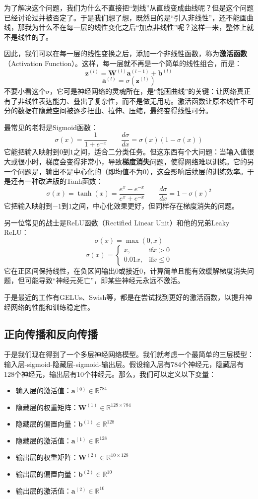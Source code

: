 为了解决这个问题，我们为什么不直接把“划线”从直线变成曲线呢？但是这个问题已经讨论过并被否定了。于是我们想了想，既然目的是“引入非线性”，还不能画曲线，那我为什么不在每一层的线性变化之后“加点非线性”呢？这样一来，整体上就不是线性的了。

因此，我们可以在每一层的线性变换之后，添加一个非线性函数，称为\textbf{激活函数}（Activation Function）。这样，每一层就不再是一个简单的线性组合，而是：
\[ \mathbf{z}^{(l)} = \mathbf{W}^{(l)} \mathbf{a}^{(l-1)} + \mathbf{b}^{(l)} \]
\[ \mathbf{a}^{(l)} = \sigma(\mathbf{z}^{(l)}) \]
不要小看这个$\sigma$，它可是神经网络的灵魂所在，是“能画曲线”的关键：让网络真正有了非线性表达能力、叠出了复杂性，而不是做无用功。激活函数让原本线性不可分的数据在隐藏空间被逐步扭曲、拉伸、压缩，最终变得线性可分。

最常见的老将是Sigmoid函数：
\[ \sigma(x) = \frac{1}{1 + e^{-x}} \qquad \frac{d\sigma}{dx} = \sigma(x)(1 - \sigma(x)) \]
它能把输入映射到$0$到$1$之间，适合二分类任务。但这东西有个大问题：当输入值很大或很小时，梯度会变得非常小，导致\textbf{梯度消失}问题，使得网络难以训练。它的另一个问题是，输出不是中心化的（即均值不为0），这会影响后续层的训练效率。于是还有一种改进版的Tanh函数：
\[ \sigma(x) = \tanh(x) = \frac{e^{x} - e^{-x}}{e^{x} + e^{-x}} \qquad \frac{d\sigma}{dx} = 1 - \sigma(x)^2\]
它把输入映射到$-1$到$1$之间，中心化效果更好，但同样存在梯度消失的问题。

另一位常见的战士是ReLU函数（Rectified Linear Unit）和他的兄弟Leaky ReLU：
\[ \sigma(x) = \max(0, x) \]
\[ \sigma(x) = \begin{cases} x, & \text{if} x > 0 \\ 0.01x, & \text{if} x \leq 0 \end{cases} \]
它在正区间保持线性，在负区间输出0或接近0，计算简单且能有效缓解梯度消失问题，但可能导致“神经元死亡”，即某些神经元永远不激活。

于是最近的工作有GELUs、Swish等，都是在尝试找到更好的激活函数，以提升神经网络的性能和训练稳定性。

\subsection{正向传播和反向传播}

于是我们现在得到了一个多层神经网络模型。我们就考虑一个最简单的三层模型：输入层-sigmoid-隐藏层-sigmoid-输出层。假设输入层有784个神经元，隐藏层有128个神经元，输出层有10个神经元。那么，我们可以定义以下变量：
\begin{itemize}
    \item 输入层的激活值：$\mathbf{a}^{(0)} \in \mathbb{R}^{784}$
    \item 隐藏层的权重矩阵：$\mathbf{W}^{(1)} \in \mathbb{R}^{128 \times 784}$
    \item 隐藏层的偏置向量：$\mathbf{b}^{(1)} \in \mathbb{R}^{128}$
    \item 隐藏层的激活值：$\mathbf{a}^{(1)} \in \mathbb{R}^{128}$
    \item 输出层的权重矩阵：$\mathbf{W}^{(2)} \in \mathbb{R}^{10 \times 128}$
    \item 输出层的偏置向量：$\mathbf{b}^{(2)} \in \mathbb{R}^{10}$
    \item 输出层的激活值：$\mathbf{a}^{(2)} \in \mathbb{R}^{10}$
\end{itemize}

